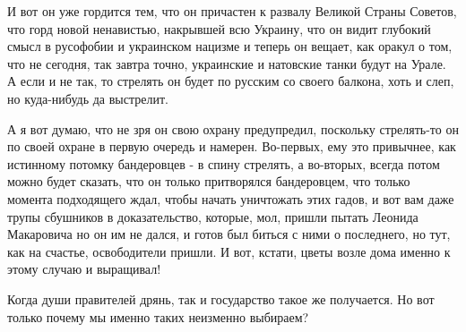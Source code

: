 И вот он уже гордится тем, что он причастен к развалу Великой Страны Советов,
что горд новой ненавистью, накрывшей всю Украину, что он видит глубокий смысл в
русофобии и украинском нацизме и теперь он вещает, как оракул о том, что не
сегодня, так завтра точно, украинские и натовские танки будут на Урале. А если
и не так, то стрелять он будет по русским со своего балкона, хоть и слеп, но
куда-нибудь да выстрелит. 

А я вот думаю, что не зря он свою охрану предупредил, поскольку стрелять-то он
по своей охране в первую очередь и намерен. Во-первых, ему это привычнее, как
истинному потомку бандеровцев - в спину стрелять, а во-вторых, всегда потом
можно будет сказать, что он только притворялся бандеровцем, что только момента
подходящего ждал, чтобы начать уничтожать этих гадов, и вот вам даже трупы
сбушников в доказательство, которые, мол, пришли пытать Леонида Макаровича но
он им не дался, и готов был биться с ними о последнего, но тут, как на счастье,
освободители пришли. И вот, кстати, цветы возле дома именно к этому случаю и
выращивал! 

Когда души правителей дрянь, так и государство такое же получается. Но вот
только почему мы именно таких неизменно выбираем?
